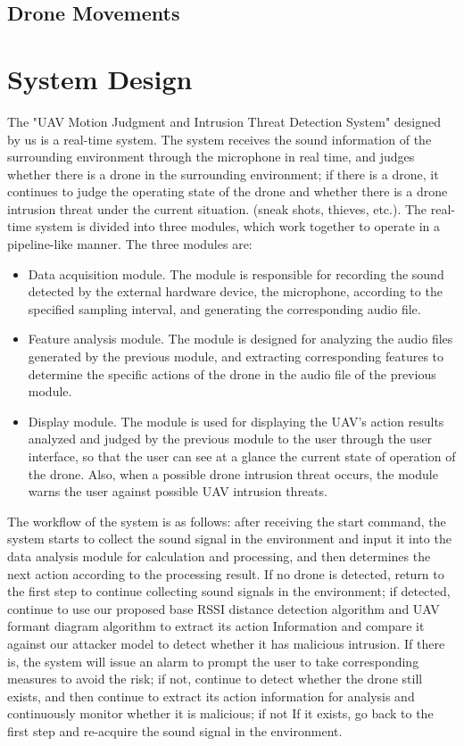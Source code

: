 \documentclass{sig-alternate-10pt}
\begin{document}
\subsection{Drone Movements}

\section{System Design}
The "UAV Motion Judgment and Intrusion Threat Detection System" designed by us is a real-time system. The system receives the sound information of the surrounding environment through the microphone in real time, and judges whether there is a drone in the surrounding environment; if there is a drone, it continues to judge the operating state of the drone and whether there is a drone intrusion threat under the current situation. (sneak shots, thieves, etc.). The real-time system is divided into three modules, which work together to operate in a pipeline-like manner. The three modules are:
\begin{itemize}
    \item Data acquisition module. The module is responsible for recording the sound detected by the external hardware device, the microphone, according to the specified sampling interval, and generating the corresponding audio file.
    \item Feature analysis module. The module is designed for analyzing the audio files generated by the previous module, and extracting corresponding features to determine the specific actions of the drone in the audio file of the previous module.
    \item Display module. The module is used for displaying the UAV’s action results analyzed and judged by the previous module to the user through the user interface, so that the user can see at a glance the current state of operation of the drone. Also, when a possible drone intrusion threat occurs, the module warns the user against possible UAV intrusion threats.
\end{itemize}

The workflow of the system is as follows: after receiving the start command, the system starts to collect the sound signal in the environment and input it into the data analysis module for calculation and processing, and then determines the next action according to the processing result. If no drone is detected, return to the first step to continue collecting sound signals in the environment; if detected, continue to use our proposed base RSSI distance detection algorithm and UAV formant diagram algorithm to extract its action Information and compare it against our attacker model to detect whether it has malicious intrusion. If there is, the system will issue an alarm to prompt the user to take corresponding measures to avoid the risk; if not, continue to detect whether the drone still exists, and then continue to extract its action information for analysis and continuously monitor whether it is malicious; if not If it exists, go back to the first step and re-acquire the sound signal in the environment.
\end{document}
